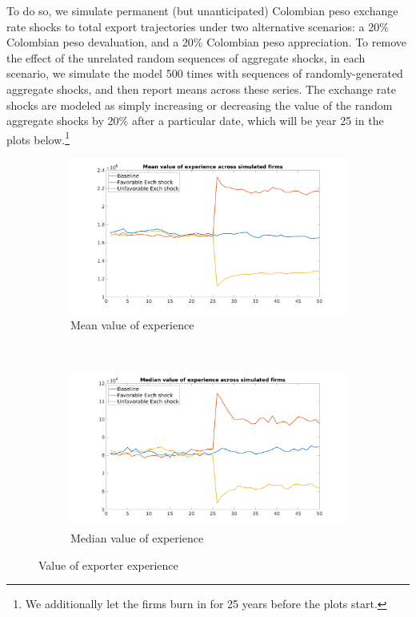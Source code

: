 \documentclass[12pt]{article}
\begin{document}
To do so, we simulate permanent (but unanticipated) Colombian peso exchange
rate shocks to total export trajectories under two alternative scenarios: a
20\% Colombian peso devaluation, and a 20\% Colombian peso appreciation. To
remove the effect of the unrelated random sequences of aggregate shocks, in
each scenario, we simulate the model 500 times with sequences of
randomly-generated aggregate shocks, and then report means across these
series. The exchange rate shocks are modeled as simply increasing or
decreasing the value of the random aggregate shocks by 20\% after a
particular date, which will be year 25 in the plots below.\footnote{%
We additionally let the firms burn in for 25 years before the plots start.} 
\begin{figure}[tbp]
\centering
\begin{subfigure}[b]{0.45\textwidth}
        \centering
        \includegraphics[width=\textwidth]{figures/intangible_value_per_firm}
        \caption{Mean value of experience}
    \end{subfigure} ~ 
\begin{subfigure}[b]{0.45\textwidth}
        \centering
        \includegraphics[width=\textwidth]{figures/intangible_value_per_firm_median}
        \caption{Median value of experience}
    \end{subfigure} \newline
\caption{Value of exporter experience}
\label{fig:avg_value}
\end{figure}
\end{document}
